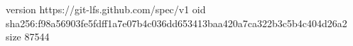 version https://git-lfs.github.com/spec/v1
oid sha256:f98a56903fe5fdff1a7e07b4c036dd653413baa420a7ca322b3c5b4c404d26a2
size 87544
